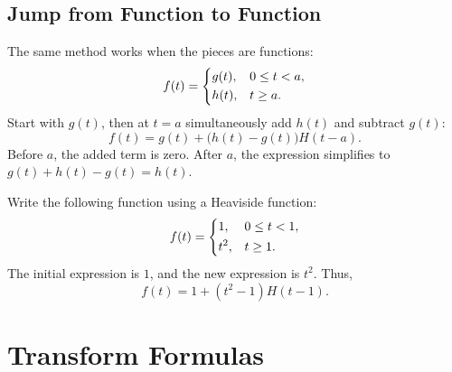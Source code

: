 \documentclass[10pt,letterpaper]{article}
\begin{document}
\subsection{Jump from Function to Function}

The same method works when the pieces are functions:
\[
f(t)=
\begin{dcases}
g(t), & 0\le t<a,\\
h(t), & t\ge a.
\end{dcases}
\]
Start with $g(t)$, then at $t=a$ simultaneously add $h(t)$ and subtract $g(t)$:
\[
\boxed{
f(t)=g(t)+\bigl(h(t)-g(t)\bigr)H(t-a).
}
\]
Before $a$, the added term is zero. After $a$, the
expression simplifies to $g(t)+h(t)-g(t)=h(t)$.

\begin{example}[3]{
Write the following function using a Heaviside function:
\[
f(t)=
\begin{dcases}
1, & 0\le t<1,\\
t^2, & t\ge1.
\end{dcases}
\]
}
The initial expression is $1$, and the new expression
is $t^2$. Thus,
\[
\boxed{f(t)=1+(t^2-1)H(t-1).}
\]
\end{example}

\section{Transform Formulas}
\end{document}
